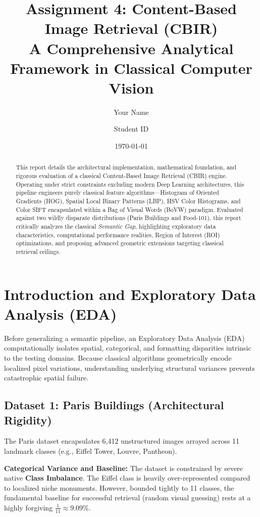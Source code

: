 \documentclass[11pt, a4paper]{article}
\title{\textbf{Assignment 4: Content-Based Image Retrieval (CBIR)} \\ \large A Comprehensive Analytical Framework in Classical Computer Vision}
\author{Your Name \and Student ID}
\date{\today}
\begin{document}
\maketitle

\begin{abstract}
This report details the architectural implementation, mathematical foundation, and rigorous evaluation of a classical Content-Based Image Retrieval (CBIR) engine. Operating under strict constraints excluding modern Deep Learning architectures, this pipeline engineers purely classical feature algorithms—Histogram of Oriented Gradients (HOG), Spatial Local Binary Patterns (LBP), HSV Color Histograms, and Color SIFT encapsulated within a Bag of Visual Words (BoVW) paradigm. Evaluated against two wildly disparate distributions (Paris Buildings and Food-101), this report critically analyzes the classical \textit{Semantic Gap}, highlighting exploratory data characteristics, computational performance realities, Region of Interest (ROI) optimizations, and proposing advanced geometric extensions targeting classical retrieval ceilings.
\end{abstract}

\newpage
\tableofcontents
\newpage

\section{Introduction and Exploratory Data Analysis (EDA)}

Before generalizing a semantic pipeline, an Exploratory Data Analysis (EDA) computationally isolates spatial, categorical, and formatting disparities intrinsic to the testing domains. Because classical algorithms geometrically encode localized pixel variations, understanding underlying structural variances prevents catastrophic spatial failure.

\subsection{Dataset 1: Paris Buildings (Architectural Rigidity)}
The Paris dataset encapsulates 6,412 unstructured images arrayed across 11 landmark classes (e.g., Eiffel Tower, Louvre, Pantheon). 

\textbf{Categorical Variance and Baseline:} The dataset is constrained by severe native \textbf{Class Imbalance}. The Eiffel class is heavily over-represented compared to localized niche monuments. However, bounded tightly to 11 classes, the fundamental baseline for successful retrieval (random visual guessing) rests at a highly forgiving $\frac{1}{11} \approx 9.09\%$. 
\end{document}
